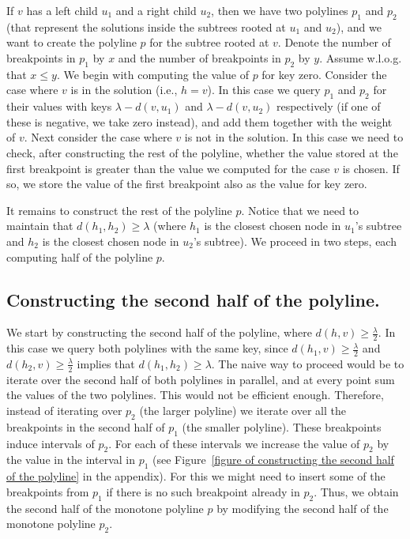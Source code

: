 \documentclass[a4paper,UKenglish]{lipics-v2016}
\theoremstyle{plain}
\begin{document}
If $v$ has a left child $u_1$ and a right child  $u_2$, then we have two polylines $p_1$ and $p_2$ (that represent the solutions inside the subtrees rooted at $u_1$ and $u_2$), and we want to create the polyline $p$ for the subtree rooted at $v$. Denote the number of breakpoints in $p_1$ by $x$ and the number of breakpoints in $p_2$ by $y$. Assume w.l.o.g. that $x \leq y$.
%
We begin with computing the value of $p$ for key zero. Consider the case where $v$ is in the solution (i.e., $h=v$). In this case we query $p_1$ and $p_2$ for their values with keys $\lambda - d(v,u_1)$ and $\lambda - d(v,u_2)$ respectively (if one of these is negative, we take zero instead), and add them together with the weight of $v$. Next consider the case where $v$ is not in the solution. %
In this case we need to check, after constructing the rest of the polyline, whether the value stored at the first breakpoint is greater than the value we computed for the case $v$ is chosen. If so, we store the value of the first breakpoint also as the value for key zero.

It remains to construct the rest of the polyline $p$. Notice that we need to maintain that $d(h_1,h_2) \geq \lambda$ (where $h_1$ is the closest chosen node in $u_1$'s subtree and $h_2$ is the closest chosen node in $u_2$'s subtree). We proceed in two steps, each computing half of the polyline $p$.

\subsection{Constructing the second half of the polyline.}\label{subsection constructing the second half of the polyline} We start by constructing the second half of the polyline, where $d(h,v) \geq \frac{\lambda}{2}$. In this case we query both polylines with the same key, since $d(h_1,v) \geq \frac{\lambda}{2}$ and $d(h_2,v) \geq \frac{\lambda}{2}$ implies that $d(h_1,h_2) \geq \lambda$. The naive way to proceed would be to iterate over the second half of both polylines in parallel, and at every point sum the values of the two polylines. This would not be efficient enough. Therefore, instead of iterating over $p_2$ (the larger polyline) we iterate over all the breakpoints in the second half of $p_1$ (the smaller polyline). These breakpoints induce intervals of $p_2$. For each of these intervals we increase the value of $p_{2}$ by the value in the interval in $p_1$ (see Figure~\ref{figure of constructing the second half of the polyline} in the appendix). For this we might need to insert some of the breakpoints from $p_1$ if there is no such breakpoint already in $p_2$. Thus, we obtain the second half of the monotone polyline $p$ by modifying the second half of the monotone polyline $p_{2}$.
\end{document}
